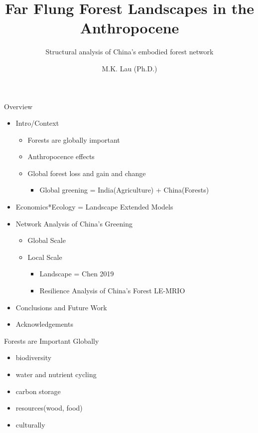 \documentclass[ignorenonframetext,]{beamer}
\title{Far Flung Forest Landscapes in the Anthropocene}
\subtitle{Structural analysis of China's embodied forest network}
\author{M.K. Lau (Ph.D.)}
\date{}
\providecommand{\tightlist}{%
  \setlength{\itemsep}{0pt}\setlength{\parskip}{0pt}}
\begin{document}
\frame{\titlepage}

\begin{frame}{Overview}
\protect\hypertarget{overview}{}

\begin{itemize}
\tightlist
\item
  Intro/Context

  \begin{itemize}
  \tightlist
  \item
    Forests are globally important
  \item
    Anthropocence effects
  \item
    Global forest loss and gain and change

    \begin{itemize}
    \tightlist
    \item
      Global greening = India(Agriculture) + China(Forests)
    \end{itemize}
  \end{itemize}
\item
  Economics*Ecology = Landscape Extended Models
\item
  Network Analysis of China's Greening

  \begin{itemize}
  \tightlist
  \item
    Global Scale
  \item
    Local Scale

    \begin{itemize}
    \tightlist
    \item
      Landscape = Chen 2019
    \item
      Resilience Analysis of China's Forest LE-MRIO
    \end{itemize}
  \end{itemize}
\item
  Conclusions and Future Work
\item
  Acknowledgements
\end{itemize}

\end{frame}

\begin{frame}{Forests are Important Globally}
\protect\hypertarget{forests-are-important-globally}{}

\begin{itemize}
\tightlist
\item
  biodiversity
\item
  water and nutrient cycling
\item
  carbon storage
\item
  resources(wood, food)
\item
  culturally
\end{itemize}

\end{frame}
\end{document}
